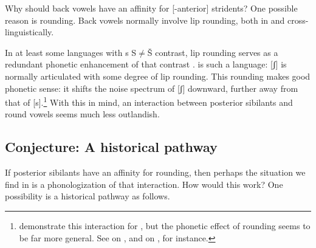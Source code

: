 \documentclass[output=paper,newtxmath,modfonts,nonflat]{langsci/langscibook}
\begin{document}
Why should back vowels have an affinity for [-anterior] stridents? One possible reason is rounding. Back vowels normally involve lip rounding, both in  and cross-linguistically. 

In at least some languages with s S${\neq}$Š contrast, lip rounding serves as a redundant phonetic enhancement of that contrast \citep{Stevens1986,Keyser&Stevens2006}.  is such a language: [ʃ] is normally articulated with some degree of lip rounding. This rounding makes good phonetic sense: it shifts the noise spectrum of [ʃ] downward, further away from that of [s].\footnote{\citet[49]{Keyser&Stevens2006} demonstrate this interaction for , but the phonetic effect of rounding seems to be far more general. See \citet[7]{NiChiosain&Padgett2001} on , and \citet[342-343]{McCollum2015} on , for instance.} With this in mind, an interaction between posterior sibilants and round vowels seems much less outlandish. 

\subsection{Conjecture: A historical pathway}\label{sec:bennett:4.2}

If posterior sibilants have an affinity for rounding, then perhaps the situation we find in  is a phonologization of that interaction. How would this work? One possibility is a historical pathway as follows.
\end{document}
